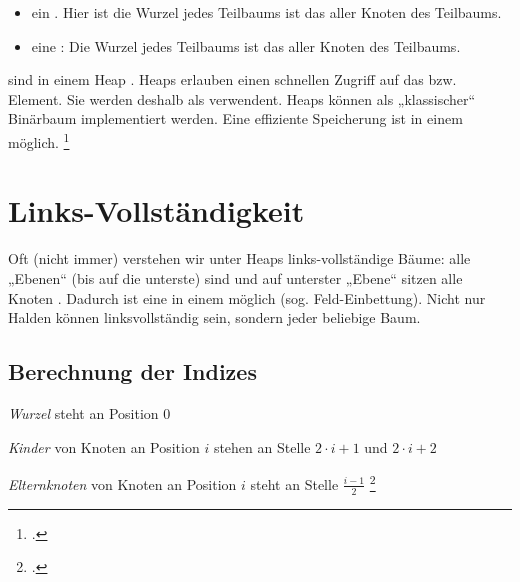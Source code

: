 \documentclass{lehramt-informatik-haupt}
\begin{document}
\begin{itemize}
\item ein . Hier ist die Wurzel jedes Teilbaums ist das
 aller Knoten des Teilbaums.
%
\item eine : Die Wurzel jedes Teilbaums ist das
 aller Knoten des Teilbaums.
\end{itemize}
%
 sind in einem Heap .
%
Heaps erlauben einen schnellen Zugriff auf das  bzw.
 Element. Sie werden deshalb als
 verwendent.
%
Heaps können als „klassischer“ Binärbaum implementiert werden. Eine
effiziente Speicherung ist in einem  möglich.
\footcite[Seite 22]{aud:fs:tafeluebung-11}

%

\section{Links-Vollständigkeit}

Oft (nicht immer) verstehen wir unter Heaps links-vollständige Bäume:
\dh alle „Ebenen“ (bis auf die unterste) sind 
und auf unterster „Ebene“ sitzen alle Knoten . Dadurch ist eine  in einem
 möglich (sog. Feld-Einbettung). Nicht nur Halden können
linksvollständig sein, sondern jeder beliebige Baum.

%

\subsection{Berechnung der Indizes}

\begin{compactitem}
\item \emph{Wurzel} steht an Position $0$

\item \emph{Kinder} von Knoten an Position $i$ stehen an Stelle
$2 \cdot i + 1$ und $2 \cdot i + 2$

\item \emph{Elternknoten} von Knoten an Position $i$ steht an Stelle
$\frac{i - 1}{2}$
\footcite[Seite 26]{aud:fs:tafeluebung-11}
\end{compactitem}
\end{document}
